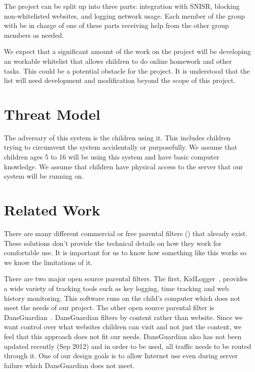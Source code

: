 \documentclass[12pt] {article}
\begin{document}
The project can be split up into three parts: integration with SNISR, blocking
non-whitelisted websites, and logging network usage. Each member of the group
with be in charge of one of these parts receiving help from the other group
members as needed.

We expect that a significant amount of the work on the project will be
developing an workable whitelist that allows children to do online homework and
other tasks. This could be a potential obstacle for the project. It is
understood that the list will need development and modification beyond the
scope of this project.


\section*{Threat Model}
The adversary of this system is the children using it. This includes children
trying to circumvent the system accidentally or purposefully. We assume that
children ages 5 to 16 will be using this system and have basic computer
knowledge.  We assume that children have physical access to the server that our
system will be running on.


\section*{Related Work}
There are many different commercial or free parental filters
(\cite{k9}\cite{netnanny}\cite{mcafee}) that already exist. These solutions
don't provide the technical details on how they work for comfortable use. It is
important for us to know how something like this works so we know the
limitations of it.

There are two major open source parental filters. The first,
KidLogger~\cite{kidlogger}, provides a wide variety of tracking tools such as
key logging, time tracking and web history monitoring. This software runs on
the child's computer which does not meet the needs of our project. The other
open source parental filter is DansGuardian~\cite{dansgaurdian}. DansGuardian
filters by content rather than website. Since we want control over what
websites children can visit and not just the content, we feel that this
approach does not fit our needs.  DansGuardian also has not been updated
recently (Sep 2012) and in order to be used, all traffic needs to be routed
through it. One of our design goals is to allow Internet use even during server
failure which DansGuardian does not meet.
\end{document}

